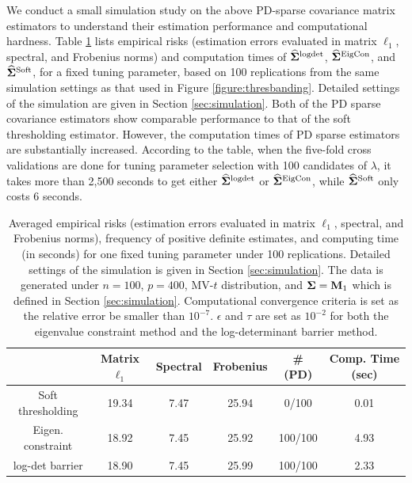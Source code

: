 \documentclass[times,sort&compress,3p]{elsarticle}
\begin{document}
We conduct a small simulation study on the above PD-sparse covariance matrix estimators to understand their estimation performance and computational hardness.
 Table  \ref{table:timecomp0} lists empirical risks (estimation errors evaluated in matrix $\ell_1$, spectral, and Frobenius norms) and computation times of $\widehat{\bf \Sigma}^{\rm logdet}$, $\widehat{\bf \Sigma}^{\rm EigCon}$, and $\widehat{\bf \Sigma}^{\rm Soft}$, for a fixed tuning parameter, based on 100 replications from the same simulation settings as that used in  Figure \ref{figure:thresbanding}.
Detailed settings of the simulation are given in Section \ref{sec:simulation}.
Both of the PD sparse covariance estimators show comparable performance to that of the soft thresholding estimator. %
However, the computation  times of PD sparse estimators
 are substantially increased.
According to the table, when the five-fold cross validations are done for tuning parameter selection with 100 candidates of $\lambda$,
it takes more than 2,500 seconds to get either $\widehat{\bf \Sigma}^{\rm logdet}$ or $\widehat{\bf \Sigma}^{\rm EigCon}$,
while $\widehat{\bf \Sigma}^{\rm Soft}$ only costs 6 seconds.
\begin{table}[h]{
\begin{center}
\begin{tabular}{c|ccccc}
\hline
	  & Matrix $\ell_1$ & Spectral & Frobenius & \#(PD) & Comp. Time (sec)  \\
\hline
Soft thresholding &  19.34  & 7.47   & 25.94  & 0/100 & 0.01  \\
Eigen. constraint  & 18.92  & 7.45  & 25.92  & 100/100 & 4.93 \\
log-det barrier  & 18.90  & 7.45  & 25.99  & 100/100  & 2.33 \\
\hline				
\end{tabular}
\caption{Averaged empirical risks (estimation errors evaluated in matrix $\ell_1$, spectral, and Frobenius norms), frequency of positive definite estimates, and computing time (in seconds) for one fixed tuning parameter under 100 replications.
 Detailed settings of the simulation is given in Section \ref{sec:simulation}. The data is generated under
$n=100$, $p=400$, MV-$t$ distribution, and ${\bf \Sigma}= {\bf M}_1$ which is defined  in Section \ref{sec:simulation}.
Computational convergence criteria is set as the relative error be smaller than $10^{-7}$.
$\epsilon$ and $\tau$ are set as $10^{-2}$ for both the eigenvalue constraint method and the log-determinant barrier method.}
\label{table:timecomp0}
\end{center}
}
\end{table}
\end{document}
